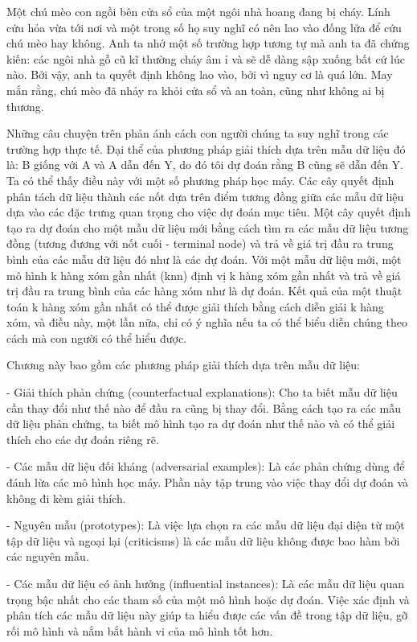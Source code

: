 Một chú mèo con ngồi bên cửa sổ của một ngôi nhà hoang đang bị cháy. Lính cứu hỏa vừa tới nơi và một trong số họ suy nghĩ có nên lao vào đống lửa để cứu chú mèo hay không. Anh ta nhớ một số trường hợp tương tự  mà anh ta đã chứng kiến: các ngôi nhà gỗ cũ kĩ thường cháy âm ỉ và sẽ dễ dàng sập xuống bất cứ lúc nào. Bởi vậy, anh ta quyết định không lao vào, bởi vì nguy cơ là quá lớn. May mắn rằng, chú mèo đã nhảy ra khỏi cửa sổ và an toàn, cũng như không ai bị thương.

Những câu chuyện trên phản ánh cách con người chúng ta suy nghĩ trong các trường hợp thực tế. Đại thể của phương pháp giải thích dựa trên mẫu dữ liệu đó là: B giống với A và A dẫn đến Y, do đó tôi dự đoán rằng B cũng sẽ dẫn đến Y. Ta có thể thấy điều này với một số phương pháp học máy. Các cây quyết định phân tách dữ liệu thành các nốt dựa trên điểm tương đồng giữa các mẫu dữ liệu dựa vào các đặc trưng quan trọng cho việc dự đoán mục tiêu. Một cây quyết định tạo ra dự đoán cho một mẫu dữ liệu mới bằng cách tìm ra các mẫu dữ liệu tương đồng (tương đương với nốt cuối - terminal node) và trả về giá trị đầu ra trung bình của các mẫu dữ liệu đó như là các dự đoán. Với một mẫu dữ liệu mới, một mô hình k hàng xóm gần nhất (knn) định vị k hàng xóm gần nhất và trả về giá trị đầu ra trung bình của các hàng xóm như là dự đoán. Kết quả của một thuật toán k hàng xóm gần nhất có thể được giải thích bằng cách diễn giải k hàng xóm, và điều này, một lần nữa, chỉ có ý nghĩa nếu ta có thể biểu diễn chúng theo cách mà con người có thể hiểu được.

Chương này bao gồm các  phương pháp giải thích dựa trên mẫu dữ liệu:

- Giải thích phản chứng (counterfactual explanations): Cho ta biết mẫu dữ liệu cần thay đổi như thế nào để đầu ra cũng bị thay đổi. Bằng cách tạo ra các mẫu dữ liệu phản chứng, ta biết mô hình tạo ra dự đoán như thế nào và có thể giải thích cho các dự đoán riêng rẽ.

- Các mẫu dữ liệu đối kháng (adversarial examples): Là các phản chứng dùng để đánh lừa các mô hình học máy. Phần này tập trung vào việc thay đổi dự đoán và không đi kèm giải thích.

- Nguyên mẫu (prototypes): Là việc lựa chọn ra các mẫu dữ liệu đại diện từ một tập dữ liệu và ngoại lại (criticisms) là các mẫu dữ liệu không được bao hàm bởi các nguyên mẫu.

- Các mẫu dữ liệu có ảnh hưởng (influential instances): Là các mẫu dữ liệu quan trọng bậc nhất cho các tham số của một mô hình hoặc dự đoán. Việc xác định và phân tích các mẫu dữ liệu này giúp ta hiểu được các vấn đề trong tập dữ liệu, gỡ rối mô hình và nắm bắt hành vi của mô hình tốt hơn.

